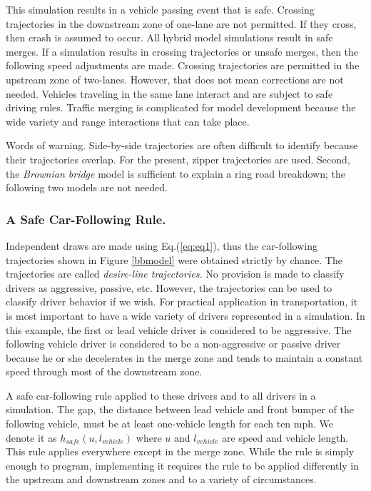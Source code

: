 \documentclass[Proceedings]{ascelike}
\begin{document}
This simulation results in a vehicle passing event that is safe. Crossing trajectories in the downstream zone of one-lane are not permitted. If they cross, then crash is assumed to occur. All hybrid model simulations result in safe merges. If a simulation results in crossing trajectories or unsafe merges, then the following speed adjustments are made. Crossing trajectories are permitted in the upstream zone of two-lanes. However, that does not mean corrections are not needed.  Vehicles traveling in the same lane interact and are subject to safe driving rules. Traffic merging is complicated for model development because the wide variety and range interactions that can take place.

Words of warning. Side-by-side trajectories are often difficult to identify because their trajectories overlap. For the present, zipper trajectories are   used. Second, the \emph{Brownian bridge} model is sufficient to explain a ring road breakdown; the following two models are not needed.



\subsubsection{A Safe Car-Following Rule.} 

Independent draws are made using Eq.(\ref{eq:eq1}), thus the car-following trajectories shown in Figure \ref{bbmodel} were obtained strictly by chance. The trajectories are called \emph{desire-line trajectories.} No provision is made to classify drivers as aggressive, passive,  etc. However, the trajectories can be used to classify driver behavior if we wish. For practical application in transportation, it is  most important to have a wide variety of drivers represented in a simulation. In this example, the first or lead vehicle driver is considered  to be aggressive. The following vehicle driver  is considered to be a non-aggressive or passive driver  because he or she decelerates in the merge zone and tends to maintain a constant speed through most of the downstream zone.  

A safe car-following rule applied to these drivers and to all drivers in a simulation. The gap, the distance between lead vehicle and front bumper of the following vehicle, must be at least one-vehicle length for each ten mph. We denote it as $h_{safe}(u, l_{vehicle})$ where $u$ and $l_{vehicle}$ are speed and vehicle length. This rule applies everywhere except in the  merge zone. While the rule is simply enough to program, implementing it requires the rule to be applied differently in the upstream and downstream zones and to a variety of circumstances. 
\end{document}
